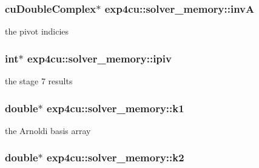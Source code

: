 \subsubsection[{\texorpdfstring{invA}{invA}}]{\setlength{\rightskip}{0pt plus 5cm}cu\+Double\+Complex$\ast$ exp4cu\+::solver\+\_\+memory\+::invA}\hypertarget{structexp4cu_1_1solver__memory_a7e113949ec6861bbdf232d99badd8ed9}{}\label{structexp4cu_1_1solver__memory_a7e113949ec6861bbdf232d99badd8ed9}


the pivot indicies 

\subsubsection[{\texorpdfstring{ipiv}{ipiv}}]{\setlength{\rightskip}{0pt plus 5cm}int$\ast$ exp4cu\+::solver\+\_\+memory\+::ipiv}\hypertarget{structexp4cu_1_1solver__memory_a906f92c7521970bb4682737769d0b854}{}\label{structexp4cu_1_1solver__memory_a906f92c7521970bb4682737769d0b854}


the stage 7 results 

\subsubsection[{\texorpdfstring{k1}{k1}}]{\setlength{\rightskip}{0pt plus 5cm}double$\ast$ exp4cu\+::solver\+\_\+memory\+::k1}\hypertarget{structexp4cu_1_1solver__memory_a184c23b8411b8772b53dae0e6fe99723}{}\label{structexp4cu_1_1solver__memory_a184c23b8411b8772b53dae0e6fe99723}


the Arnoldi basis array 

\subsubsection[{\texorpdfstring{k2}{k2}}]{\setlength{\rightskip}{0pt plus 5cm}double$\ast$ exp4cu\+::solver\+\_\+memory\+::k2}\hypertarget{structexp4cu_1_1solver__memory_a8f4b3ca501187945e4620f44506f6882}{}\label{structexp4cu_1_1solver__memory_a8f4b3ca501187945e4620f44506f6882}


